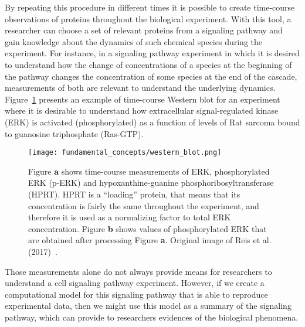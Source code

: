 By repeating this procedure in different times it is possible to create 
time-course observations of proteins throughout the biological 
experiment. With this tool, a researcher can choose a set of relevant 
proteins from a signaling pathway and gain knowledge about the dynamics 
of such chemical species during the experiment. For instance, in a 
signaling pathway experiment in which it is desired to understand how
the change of concentrations of a species at the beginning of the 
pathway changes the concentration of some species at the end of the 
cascade, measurements of both are relevant to understand the underlying dynamics. Figure~\ref{fig:western_blot_example} presents an 
example of time-course Western blot for an experiment where it is 
desirable to understand how extracellular signal-regulated kinase (ERK)
is activated (phosphorylated) as a function of levels of Rat sarcoma
bound to guanosine triphosphate (Ras-GTP).

\begin{figure}[!ht]
\centering
    \texttt{[image: fundamental\_concepts/western\_blot.png]}
    \caption{Figure {\bf a} shows time-course measurements of ERK, 
    phosphorylated ERK (p-ERK) and hypoxanthine-guanine 
    phosphoribosyltransferase (HPRT). HPRT is a ``loading'' protein, 
    that means that its concentration is fairly the same throughout the 
    experiment, and therefore it is used as a normalizing factor to 
    total ERK concentration. Figure  {\bf b} shows values of 
    phosphorylated ERK that are obtained after processing Figure 
    {\bf a}. Original image of Reis et al. (2017)~\cite{Reis2017}.}
    \label{fig:western_blot_example}
\end{figure}

Those measurements alone do not always provide means for researchers to 
understand a cell signaling pathway experiment. However, if we create a 
computational model for this signaling pathway that is able to 
reproduce experimental data, then we might use this model as a 
summary of the signaling pathway, which can provide to researchers 
evidences of the biological phenomena.


